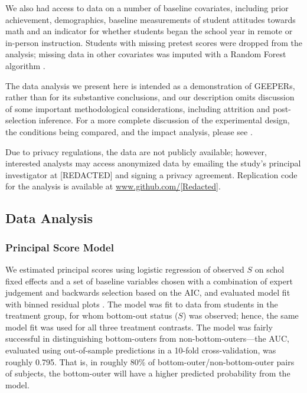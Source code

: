 \documentclass{statsoc} %
\begin{document}
We also had access to data on a number of baseline covariates, including prior achievement, demographics, baseline measurements of student attitudes towards math and an indicator for whether students began the school year in remote or in-person instruction.
Students with missing pretest scores were dropped from the analysis; missing data in other covariates was imputed with a Random Forest algorithm \citep{missForest}.

The data analysis we present here is intended as a demonstration of GEEPERs, rather than for its substantive conclusions, and our description omits discussion of some important methodological considerations, including attrition and post-selection inference. For a more complete discussion of the experimental design, the conditions being compared, and the impact analysis, please see \citet{impactPaper}.

Due to privacy regulations, the data are not publicly available; however, interested analysts may access anonymized data by emailing the study's principal investigator at [REDACTED] and signing a privacy agreement.
Replication code for the analysis is available at \url{www.github.com/[Redacted]}.

\subsection{Data Analysis}
\subsubsection{Principal Score Model}\label{sec:psMod}



We estimated principal scores using logistic regression of observed $S$ on schol fixed effects and a set of baseline variables chosen with a combination of expert judgement and backwards selection based on the AIC, and evaluated model fit with binned residual plots \citep{gelman2006data}.
The model was fit to data from students in the treatment group, for whom bottom-out status ($S$) was observed; hence, the same model fit was used for all three treatment contrasts.
The model was fairly successful in distinguishing bottom-outers from non-bottom-outers---the AUC, evaluated using out-of-sample predictions in a 10-fold cross-validation, was roughly 0.795. That is, in roughly 80\% of bottom-outer/non-bottom-outer pairs of subjects, the bottom-outer will have a higher predicted probability from the model.
\end{document}
